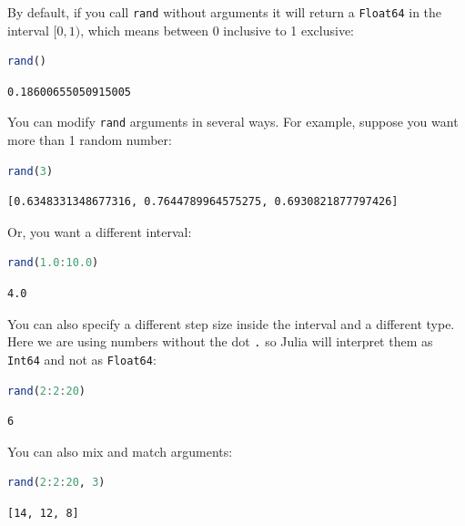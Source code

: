 \documentclass[
  notoc %
]{tufte-book}
\newcommand{\passthrough}[1]{#1}
\begin{document}
By default, if you call \passthrough{\lstinline!rand!} without arguments
it will return a \passthrough{\lstinline!Float64!} in the interval
\([0, 1)\), which means between 0 inclusive to 1 exclusive:

\begin{lstlisting}[language=Julia]
rand()
\end{lstlisting}

\begin{lstlisting}[language=Output]
0.18600655050915005
\end{lstlisting}

You can modify \passthrough{\lstinline!rand!} arguments in several ways.
For example, suppose you want more than 1 random number:

\begin{lstlisting}[language=Julia]
rand(3)
\end{lstlisting}

\begin{lstlisting}[language=Output]
[0.6348331348677316, 0.7644789964575275, 0.6930821877797426]
\end{lstlisting}

Or, you want a different interval:

\begin{lstlisting}[language=Julia]
rand(1.0:10.0)
\end{lstlisting}

\begin{lstlisting}[language=Output]
4.0
\end{lstlisting}

You can also specify a different step size inside the interval and a
different type. Here we are using numbers without the dot
\passthrough{\lstinline!.!} so Julia will interpret them as
\passthrough{\lstinline!Int64!} and not as
\passthrough{\lstinline!Float64!}:

\begin{lstlisting}[language=Julia]
rand(2:2:20)
\end{lstlisting}

\begin{lstlisting}[language=Output]
6
\end{lstlisting}

You can also mix and match arguments:

\begin{lstlisting}[language=Julia]
rand(2:2:20, 3)
\end{lstlisting}

\begin{lstlisting}[language=Output]
[14, 12, 8]
\end{lstlisting}
\end{document}
